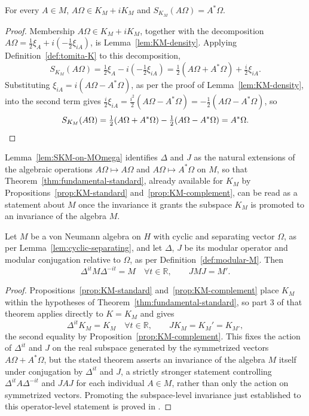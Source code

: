 \begin{lemma}\label{lem:SKM-on-MOmega}
	For every $A \in M$, $A\Omega \in K_M + iK_M$ and $S_{K_M}(A\Omega) = A^*\Omega$.
\end{lemma}

\begin{proof}
	Membership $A\Omega \in K_M + iK_M$, together with the decomposition $A\Omega = \tfrac{1}{2}\xi_A + i(-\tfrac{1}{2}\xi_{iA})$, is Lemma~\ref{lem:KM-density}. Applying Definition~\ref{def:tomita-K} to this decomposition,
	\[
	S_{K_M}(A\Omega) = \tfrac{1}{2}\xi_A - i\left(-\tfrac{1}{2}\xi_{iA}\right) = \tfrac{1}{2}(A\Omega+A^*\Omega) + \tfrac{i}{2}\xi_{iA}.
	\]
	Substituting $\xi_{iA} = i(A\Omega - A^*\Omega)$, as per the proof of Lemma~\ref{lem:KM-density}, into the second term gives $\tfrac{i}{2}\xi_{iA} = \tfrac{i^2}{2}(A\Omega-A^*\Omega) = -\tfrac{1}{2}(A\Omega-A^*\Omega)$, so
	\[
	S_{K_M}(A\Omega) = \tfrac{1}{2}(A\Omega+A^*\Omega) - \tfrac{1}{2}(A\Omega-A^*\Omega) = A^*\Omega. \qedhere
	\]
\end{proof}

Lemma~\ref{lem:SKM-on-MOmega} identifies $\Delta$ and $J$ as the natural extensions of the algebraic operations $A\Omega \mapsto A\Omega$ and $A\Omega \mapsto A^*\Omega$ on $M$, so that Theorem~\ref{thm:fundamental-standard}, already available for $K_M$ by Propositions~\ref{prop:KM-standard} and~\ref{prop:KM-complement}, can be read as a statement about $M$ once the invariance it grants the subspace $K_M$ is promoted to an invariance of the algebra $M$.

\begin{theorem}\label{thm:TT-M}
	Let $M$ be a von Neumann algebra on $H$ with cyclic and separating vector $\Omega$, as per Lemma~\ref{lem:cyclic-separating}, and let $\Delta$, $J$ be its modular operator and modular conjugation relative to $\Omega$, as per Definition~\ref{def:modular-M}. Then
	\[
	\Delta^{it} M \Delta^{-it} = M \quad \forall t \in \mathbb{R}, \qquad J M J = M'.
	\]
\end{theorem}

\begin{proof}
	Propositions~\ref{prop:KM-standard} and~\ref{prop:KM-complement} place $K_M$ within the hypotheses of Theorem~\ref{thm:fundamental-standard}, so part 3 of that theorem applies directly to $K = K_M$ and gives
	\[
	\Delta^{it} K_M = K_M \quad \forall t \in \mathbb{R}, \qquad J K_M = K_M' = K_{M'},
	\]
	the second equality by Proposition~\ref{prop:KM-complement}. This fixes the action of $\Delta^{it}$ and $J$ on the real subspace generated by the symmetrized vectors $A\Omega + A^*\Omega$, but the stated theorem asserts an invariance of the algebra $M$ itself under conjugation by $\Delta^{it}$ and $J$, a strictly stronger statement controlling $\Delta^{it}A\Delta^{-it}$ and $JAJ$ for each individual $A \in M$, rather than only the action on symmetrized vectors. Promoting the subspace-level invariance just established to this operator-level statement is proved in \cite[TODO: collocazione precisa]{TODO-RieffelVanDaele}.
\end{proof}

